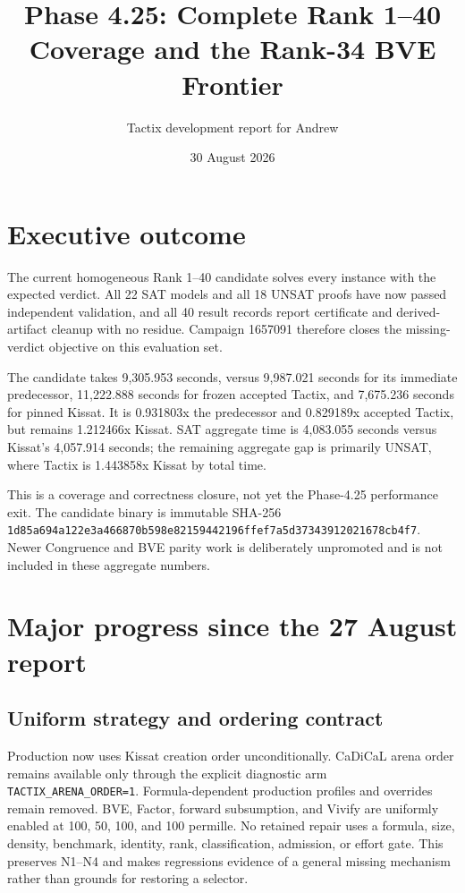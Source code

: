 \documentclass[11pt]{article}
\title{Phase 4.25: Complete Rank 1--40 Coverage and the Rank-34 BVE Frontier}
\author{Tactix development report for Andrew}
\date{30 August 2026}
\newcommand{\code}[1]{\texttt{#1}}
\begin{document}
\maketitle

\section{Executive outcome}

The current homogeneous Rank 1--40 candidate solves every instance with the
expected verdict.  All 22 SAT models and all 18 UNSAT proofs have now passed
independent validation, and all 40 result records report certificate and
derived-artifact cleanup with no residue.  Campaign 1657091 therefore closes
the missing-verdict objective on this evaluation set.

The candidate takes 9,305.953 seconds, versus 9,987.021 seconds for its
immediate predecessor, 11,222.888 seconds for frozen accepted Tactix, and
7,675.236 seconds for pinned Kissat.  It is 0.931803x the predecessor and
0.829189x accepted Tactix, but remains 1.212466x Kissat.  SAT aggregate time is
4,083.055 seconds versus Kissat's 4,057.914 seconds; the remaining aggregate
gap is primarily UNSAT, where Tactix is 1.443858x Kissat by total time.

This is a coverage and correctness closure, not yet the Phase-4.25 performance
exit.  The candidate binary is immutable SHA-256
\code{1d85a694a122e3a466870b598e82159442196ffef7a5d37343912021678cb4f7}.
Newer Congruence and BVE parity work is deliberately unpromoted and is not
included in these aggregate numbers.

\section{Major progress since the 27 August report}

\subsection{Uniform strategy and ordering contract}

Production now uses Kissat creation order unconditionally.  CaDiCaL arena
order remains available only through the explicit diagnostic arm
\code{TACTIX\_ARENA\_ORDER=1}.  Formula-dependent production profiles and
overrides remain removed.  BVE, Factor, forward subsumption, and Vivify are
uniformly enabled at 100, 50, 100, and 100 permille.  No retained repair uses a
formula, size, density, benchmark, identity, rank, classification, admission,
or effort gate.  This preserves N1--N4 and makes regressions evidence of a
general missing mechanism rather than grounds for restoring a selector.
\end{document}
